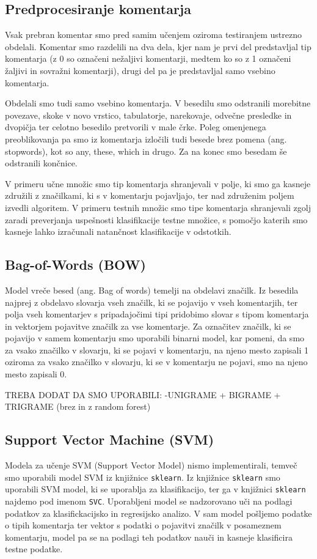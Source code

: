 \documentclass{acm_proc_article-sp}
\begin{document}
\subsection{Predprocesiranje komentarja}
Vsak prebran komentar smo pred samim učenjem oziroma testiranjem ustrezno obdelali. Komentar smo razdelili na dva dela, kjer nam je prvi del predstavljal tip komentarja (z 0 so označeni nežaljivi komentarji, medtem ko so z 1 označeni žaljivi in sovražni komentarji), drugi del pa je predstavljal samo vsebino komentarja. 

Obdelali smo tudi samo vsebino komentarja. V besedilu smo odstranili morebitne povezave, skoke v novo vrstico, tabulatorje, narekovaje, odvečne presledke in dvopičja ter celotno besedilo pretvorili v male črke. Poleg omenjenega preoblikovanja pa smo iz komentarja izločili tudi besede brez pomena (ang. stopwords), kot so any, these, which in drugo. Za na konec smo besedam še odstranili končnice.

V primeru učne množic smo tip komentarja shranjevali v polje, ki smo ga kasneje združili z značilkami, ki s v komentarju pojavljajo, ter nad združenim poljem izvedli algoritem. V primeru testnih množic smo tipe komentarja shranjevali zgolj zaradi preverjanja uspešnosti klasifikacije testne množice, s pomočjo katerih smo kasneje lahko izračunali natančnost klasifikacije v odstotkih.

\subsection{Bag-of-Words (BOW)}
Model vreče besed (ang. Bag of words) temelji na obdelavi značilk. Iz besedila najprej z obdelavo slovarja vseh značilk, ki se pojavijo v vseh komentarjih, ter polja vseh komentarjev s pripadajočimi tipi pridobimo slovar s tipom komentarja in vektorjem pojavitve značilk za vse komentarje. Za označitev značilk, ki se pojavijo v samem komentarju smo uporabili binarni model, kar pomeni, da smo za vsako značilko v slovarju, ki se pojavi v komentarju, na njeno mesto zapisali 1 oziroma za vsako značilko v slovarju, ki se v komentarju ne pojavi, smo na njeno mesto zapisali 0.

TREBA DODAT DA SMO UPORABILI:
-UNIGRAME + BIGRAME + TRIGRAME (brez in z random forest)

\subsection{Support Vector Machine (SVM)}
Modela za učenje SVM (Support Vector Model) nismo implementirali, temveč smo uporabili model SVM iz knjižnice \texttt{sklearn}.
Iz knjižnice \texttt{sklearn} smo uporabili SVM model, ki se uporablja za klasifikacijo, ter ga v knjižnici \texttt{sklearn} najdemo pod imenom \texttt{SVC}.
Uporabljeni model se nadzorovano uči na podlagi podatkov za klasifickacijsko in regresijsko analizo.
V sam model pošljemo podatke o tipih komentarja ter vektor s podatki o pojavitvi značilk v posameznem komentarju, model pa se na podlagi teh podatkov nauči in kasneje klasificira testne podatke. 
\end{document}
